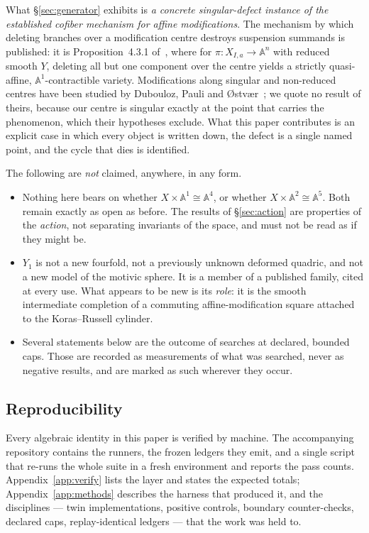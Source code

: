\documentclass[11pt]{article}
\theoremstyle{definition}
\theoremstyle{remark}
\newcommand{\Aff}[1]{\mathbb{A}^{#1}}
\begin{document}
What \S\ref{sec:generator} exhibits is \emph{a concrete singular-defect
instance of the established cofiber mechanism for affine modifications}. The
mechanism by which deleting branches over a modification centre destroys
suspension summands is published: it is Proposition~4.3.1 of~\cite{ADO2021},
where for $\pi\colon X_{I,a}\to\Aff{n}$ with reduced smooth $Y$, deleting all
but one component over the centre yields a strictly quasi-affine,
$\Aff{1}$-contractible variety. Modifications along singular and non-reduced
centres have been studied by Dubouloz, Pauli and
{\O}stv{\ae}r~\cite{DPO2018}; we quote no result of theirs, because our centre
is singular exactly at the point that carries the phenomenon, which their
hypotheses exclude. What this paper contributes is an explicit case in which
every object is written down, the defect is a single named point, and the
cycle that dies is identified.

The following are \emph{not} claimed, anywhere, in any form.

\begin{itemize}
\item Nothing here bears on whether $X\times\Aff{1}\cong\Aff{4}$, or whether
$X\times\Aff{2}\cong\Aff{5}$. Both remain exactly as open as before. The
results of \S\ref{sec:action} are properties of the \emph{action}, not
separating invariants of the space, and must not be read as if they might be.
\item $Y_1$ is not a new fourfold, not a previously unknown deformed quadric,
and not a new model of the motivic sphere. It is a member of a published
family, cited at every use. What appears to be new is its \emph{role}: it is
the smooth intermediate completion of a commuting affine-modification square
attached to the Koras--Russell cylinder.
\item Several statements below are the outcome of searches at declared,
bounded caps. Those are recorded as measurements of what was searched, never
as negative results, and are marked as such wherever they occur.
\end{itemize}

\subsection{Reproducibility}

Every algebraic identity in this paper is verified by machine. The
accompanying repository contains the runners, the frozen ledgers they emit,
and a single script that re-runs the whole suite in a fresh environment and
reports the pass counts. Appendix~\ref{app:verify} lists the layer and states
the expected totals; Appendix~\ref{app:methods} describes the harness that
produced it, and the disciplines --- twin implementations, positive controls,
boundary counter-checks, declared caps, replay-identical ledgers --- that the
work was held to.
\end{document}
